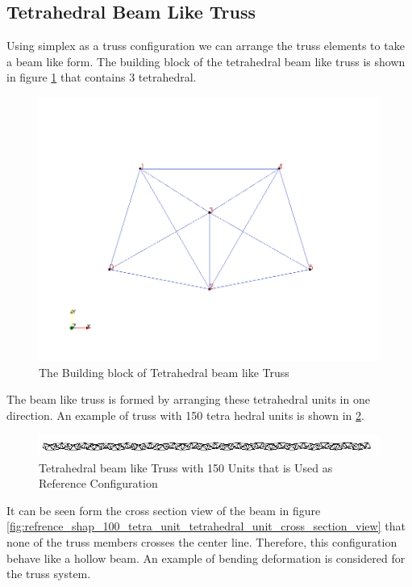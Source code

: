  
\subsection{Tetrahedral Beam Like Truss}
Using simplex as a truss configuration we can arrange the truss elements to take a beam like form.
The building block of the tetrahedral beam like truss is shown in figure \ref{fig:building_block_of_tetrahedral_truss} that contains 3 tetrahedral.
\begin{figure} 
\centering
\includegraphics[width=5.0in]{./chap_5_active_trusses//images_linear_tetrahedral/building_block_of_tetrahedral_truss.png}
\caption{The Building block of Tetrahedral beam like Truss}
\label{fig:building_block_of_tetrahedral_truss}
\end{figure} 
The beam like truss is formed by arranging these tetrahedral units in one direction.
An example of truss with 150 tetra hedral units is shown in \ref{fig:refrence_shap_100_tetra_unit_tetrahedral_unit}. 
\begin{figure} 
\centering
\includegraphics[width=5.0in]{./chap_5_active_trusses//images_linear_tetrahedral/refrence_shap_100_tetra_unit_tetrahedral_unit.png}
\caption{Tetrahedral beam like Truss with 150 Units that is Used as Reference Configuration}
\label{fig:refrence_shap_100_tetra_unit_tetrahedral_unit}
\end{figure} 
It can be seen form the cross section view of the beam in figure \ref{fig:refrence_shap_100_tetra_unit_tetrahedral_unit_cross_section_view} that none of the truss members crosses the center line.   
Therefore, this configuration behave like a hollow beam. 
An example of bending deformation is considered for the truss system.  

